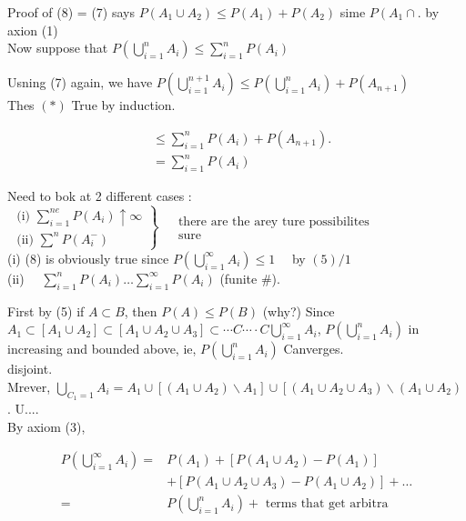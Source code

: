 \documentclass[10pt]{article}
\begin{document}
Proof of (8) = (7) says \(P\left(A_{1} \cup A_{2}\right) \leq P\left(A_{1}\right)+P\left(A_{2}\right)\) sime \(P\left(A_{1} \cap\right.\). by axion (1)\\
Now suppose that \(P\left(\bigcup_{i=1}^{n} A_{i}\right) \leq \sum_{i=1}^{n} P\left(A_{i}\right)\)

Usning (7) again, we have \(P\left(\bigcup_{i=1}^{n+1} A_{i}\right) \leq P\left(\bigcup_{i=1}^{n} A_{i}\right)+P\left(A_{n+1}\right)\)\\
Thes \((*)\) True by induction.

\[
\begin{aligned}
& \leq \sum_{i=1}^{n} P\left(A_{i}\right)+P\left(A_{n+1}\right) . \\
& =\sum_{i=1}^{n} P\left(A_{i}\right)
\end{aligned}
\]

Need to bok at 2 different cases :\\
\(\left.\begin{array}{l}\text { (i) } \sum_{i=1}^{n e} P\left(A_{i}\right) \uparrow \infty \\ \text { (ii) } \sum^{n} P\left(A_{i}^{-}\right)\end{array}\right\} \begin{aligned} & \text { there are the arey ture possibilites } \\ & \text { sure }\end{aligned}\)\\
(i) (8) is obviously true since \(P\left(\bigcup_{i=1}^{\infty} A_{i}\right) \leq 1 \quad\) by \((5) / 1\)\\
(ii) \(\quad \sum_{i=1}^{n} P\left(A_{i}\right) \ldots \sum_{i=1}^{\infty} P\left(A_{i}\right)\) (funite \#).

First by (5) if \(A \subset B\), then \(P(A) \leq P(B)\) (why?) Since \(A_{1} \subset\left[A_{1} \cup A_{2}\right] \subset\left[A_{1} \cup A_{2} \cup A_{3}\right] \subset \cdots C \cdots \cdot C \bigcup_{i=1}^{\infty} A_{i}\), \(P\left(\bigcup_{i=1}^{n} A_{i}\right)\) in increasing and bounded above, ie, \(P\left(\bigcup_{i=1}^{n} A_{i}\right)\) Canverges.\\
disjoint.\\
Mrever, \(\bigcup_{C_{1}=1} A_{i}=A_{1} \cup\left[\left(A_{1} \cup A_{2}\right) \backslash A_{1}\right] \cup\left[\left(A_{1} \cup A_{2} \cup A_{3}\right) \backslash\left(A_{1} \cup A_{2}\right)\right.\). U....\\
By axiom (3),

\[
\begin{aligned}
P\left(\bigcup_{i=1}^{\infty} A_{i}\right)= & P\left(A_{1}\right)+\left[P\left(A_{1} \cup A_{2}\right)-P\left(A_{1}\right)\right] \\
& +\left[P\left(A_{1} \cup A_{2} \cup A_{3}\right)-P\left(A_{1} \cup A_{2}\right)\right]+\ldots \\
= & P\left(\bigcup_{i=1}^{n} A_{i}\right)+\text { terms that get arbitra }
\end{aligned}
\]
\end{document}
